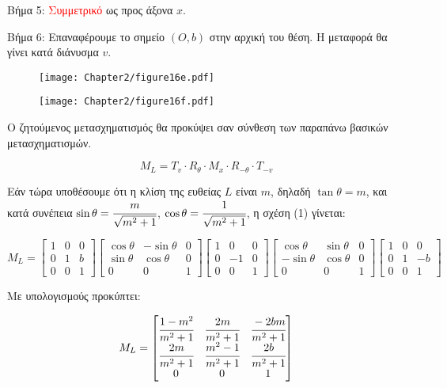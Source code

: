 \begin{solution}
Βήμα 5: \textcolor{red}{Συμμετρικό} ως προς άξονα $x$.






Βήμα 6: Επαναφέρουμε το σημείο $(O, b)$ στην αρχική του θέση. Η μεταφορά θα γίνει κατά διάνυσμα $v$.



\begin{figure}[h!]
	\begin{center}
		\begin{minipage}[b]{0.48\textwidth} %
		    \texttt{[image: Chapter2/figure16e.pdf]}
		\end{minipage}%
	\hfill
		\begin{minipage}[b]{0.48\textwidth} %
			    \texttt{[image: Chapter2/figure16f.pdf]}
		\end{minipage}
	\end{center}
\end{figure}


Ο ζητούμενος μετασχηματισμός θα προκύψει σαν σύνθεση των παραπάνω βασικών μετασχηματισμών.

\[
M_L = T_v \cdot R_{\theta} \cdot M_x \cdot R_{-\theta} \cdot T_{-v} \tag{1}
\]

Εάν τώρα υποθέσουμε ότι η κλίση της ευθείας $L$ είναι $m$, δηλαδή $\tan\theta = m$, και κατά συνέπεια $\sin\theta = \cfrac{m}{\sqrt{m^2+1}}$, $\cos\theta = \cfrac{1}{\sqrt{m^2+1}}$, η σχέση (1) γίνεται:

\[
M_L = \begin{bmatrix}
1 & 0 & 0 \\
0 & 1 & b \\
0 & 0 & 1
\end{bmatrix}
\begin{bmatrix}
\cos\theta & -\sin\theta & 0 \\
\sin\theta & \cos\theta & 0 \\
0 & 0 & 1
\end{bmatrix}
\begin{bmatrix}
1 & 0 & 0 \\
0 & -1 & 0 \\
0 & 0 & 1
\end{bmatrix}
\begin{bmatrix}
\cos\theta & \sin\theta & 0 \\
-\sin\theta & \cos\theta & 0 \\
0 & 0 & 1
\end{bmatrix}
\begin{bmatrix}
1 & 0 & 0 \\
0 & 1 & -b \\
0 & 0 & 1
\end{bmatrix}
\]

Με υπολογισμούς προκύπτει:

\[
M_L = \begin{bmatrix}
\cfrac{1 - m^2}{m^2 + 1} & \cfrac{2m}{m^2 + 1} & \cfrac{-2bm}{m^2 + 1} \\
\cfrac{2m}{m^2 + 1} & \cfrac{m^2 - 1}{m^2 + 1} & \cfrac{2b}{m^2 + 1} \\
0 & 0 & 1
\end{bmatrix}
\]
\end{solution}